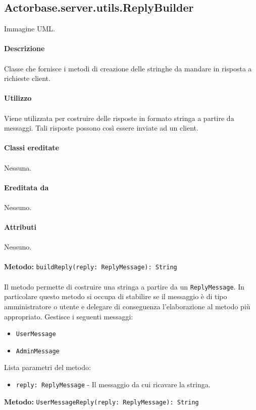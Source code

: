 \documentclass[a4paper]{article}
\begin{document}
	\subsection{Actorbase.server.utils.ReplyBuilder}
		Immagine UML.
		\\ \\
		\textbf{Descrizione}
			\\ \\
			Classe che fornisce i metodi di creazione delle stringhe da mandare in risposta a richieste client.
			\\ \\
		\textbf{Utilizzo}
			\\ \\
			Viene utilizzata per costruire delle risposte in formato stringa a partire da messaggi. Tali risposte possono così essere inviate ad un client.
			\\ \\
		\textbf{Classi ereditate}
			\\ \\
			Nessuna.
			\\ \\
		\textbf{Ereditata da}
			\\ \\
			Nessuno.
			\\ \\
		\textbf{Attributi}
			\\ \\
			Nessuno.
			\\ \\
		\textbf{Metodo: }\texttt{buildReply(reply: ReplyMessage): String}
			\\ \\
			Il metodo permette di costruire una stringa a partire da un \texttt{ReplyMessage}. In particolare questo metodo si occupa di stabilire se il messaggio è di tipo amministratore o utente e delegare di conseguenza l'elaborazione al metodo più appropriato.
			Gestisce i seguenti messaggi:
			\begin{itemize}
				\item \texttt{UserMessage}
				\item \texttt{AdminMessage}
			\end{itemize}
			Lista parametri del metodo:
			\begin{itemize}
				\item \texttt{reply: ReplyMessage} - Il messaggio da cui ricavare la stringa.
			\end{itemize}
		\textbf{Metodo: }\texttt{UserMessageReply(reply: ReplyMessage): String}
\end{document}
